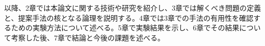 以降、2章では本論文に関する技術や研究を紹介し、3章では解くべき問題の定義と、提案手法の核となる論理を説明する。4章では3章での手法の有用性を確認するための実験方法について述べる。5章で実験結果を示し、6章でその結果について考察した後、7章で結論と今後の課題を述べる。








